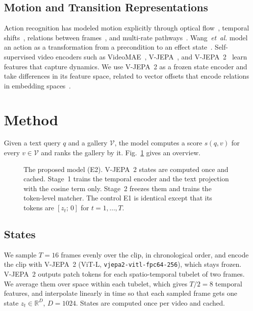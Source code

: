 \documentclass[lettersize,journal]{IEEEtran}
\begin{document}
\subsection{Motion and Transition Representations}
Action recognition has modeled motion explicitly through optical
flow~\cite{simonyan2014twostream}, temporal shifts~\cite{lin2019tsm}, relations
between frames~\cite{zhou2018trn}, and multi-rate
pathways~\cite{feichtenhofer2019slowfast}. Wang~\textit{et~al.} model an action
as a transformation from a precondition to an effect
state~\cite{wang2016actions}. Self-supervised video encoders such as
VideoMAE~\cite{tong2022videomae}, V-JEPA~\cite{bardes2024vjepa}, and
V-JEPA~2~\cite{assran2025vjepa2} learn features that capture dynamics. We use
V-JEPA~2 as a frozen state encoder and take differences in its feature space,
related to vector offsets that encode relations in embedding
spaces~\cite{mikolov2013linguistic}.

\section{Method}
\label{sec:method}
Given a text query $q$ and a gallery $\mathcal V$, the model computes a score
$s(q,v)$ for every $v\in\mathcal V$ and ranks the gallery by it.
Fig.~\ref{fig:pipeline} gives an overview.

\begin{figure}[!t]
\centering
\resizebox{\textwidth}{!}{}
\caption{The proposed model (E2). V-JEPA~2 states are computed once and cached.
Stage~1 trains the temporal encoder and the text projection with the cosine
term only. Stage~2 freezes them and trains the token-level matcher. The
control E1 is identical except that its tokens are $[z_t;\,0]$ for
$t=1,\dots,T$.}
\label{fig:pipeline}
\end{figure}

\subsection{States}
We sample $T=16$ frames evenly over the clip, in chronological order, and encode
the clip with V-JEPA~2 (ViT-L, \texttt{vjepa2-vitl-fpc64-256}), which stays
frozen. V-JEPA~2 outputs patch tokens for each spatio-temporal tubelet of two
frames. We average them over space within each tubelet, which gives $T/2=8$
temporal features, and interpolate linearly in time so that each sampled frame
gets one state $z_t\in\mathbb R^{D}$, $D=1024$. States are computed once per
video and cached.
\end{document}
